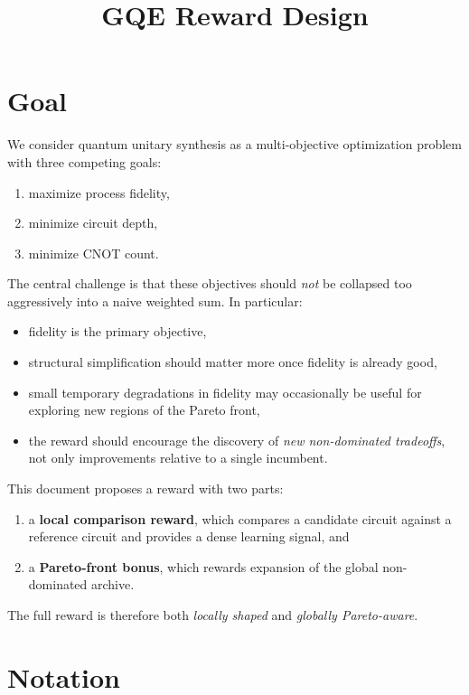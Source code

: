 \documentclass[11pt]{article}
\title{GQE Reward Design}
\author{}
\date{}
\begin{document}
\maketitle

\section{Goal}

We consider quantum unitary synthesis as a multi-objective optimization problem with three competing goals:
\begin{enumerate}[label=(\roman*)]
    \item maximize process fidelity,
    \item minimize circuit depth,
    \item minimize CNOT count.
\end{enumerate}

The central challenge is that these objectives should \emph{not} be collapsed too aggressively into a naive weighted sum. In particular:
\begin{itemize}
    \item fidelity is the primary objective,
    \item structural simplification should matter more once fidelity is already good,
    \item small temporary degradations in fidelity may occasionally be useful for exploring new regions of the Pareto front,
    \item the reward should encourage the discovery of \emph{new non-dominated tradeoffs}, not only improvements relative to a single incumbent.
\end{itemize}

This document proposes a reward with two parts:
\begin{enumerate}[label=(\arabic*)]
    \item a \textbf{local comparison reward}, which compares a candidate circuit against a reference circuit and provides a dense learning signal, and
    \item a \textbf{Pareto-front bonus}, which rewards expansion of the global non-dominated archive.
\end{enumerate}

The full reward is therefore both \emph{locally shaped} and \emph{globally Pareto-aware}.

\section{Notation}
\end{document}

